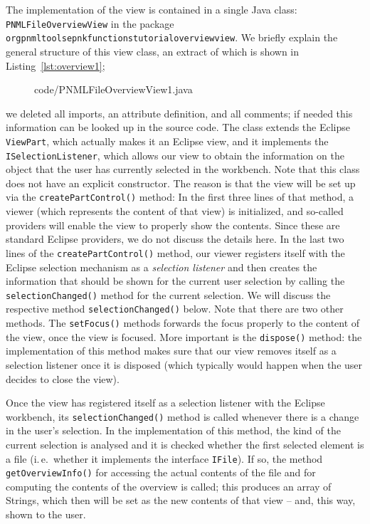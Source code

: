 The implementation of the view is contained in a single Java class: {\tt
PNMLFileOverviewView} in the package
{\tt org\qnsep{}pnml\qnsep{}tools\qnsep{}epnk\qnsep{}functions\qnsep{}tutorial\qnsep{}overviewview}.
We briefly explain the general structure of this view class, an extract
of which is shown in Listing~\ref{lst:overview1};
%
\begin{figure}[htbp!]
%
  {code/PNMLFileOverviewView1.java}
\end{figure}
%
we deleted all imports, an attribute definition, and all comments; if needed
this information can be looked up in the source code. The class extends the Eclipse
{\tt ViewPart},%
which actually makes it an Eclipse view, and it implements the {\tt
ISelectionListener},%
which allows our view to obtain the information on the object that the user
has currently selected in the workbench.
Note that this class does not have an explicit constructor. The reason is that
the view will be set up via the {\tt createPartControl()} method:
In the first three lines of that method, a viewer (which represents the content
of that view) is initialized, and so-called providers will enable the view to
properly show the contents. Since these are standard Eclipse providers, we do
not discuss the details here.
In the last two lines of the {\tt createPartControl()} method,
our viewer registers itself with the Eclipse selection mechanism
as a \emph{selection listener}%
and then creates the information that should be shown for the current user selection
by calling the {\tt selectionChanged()} method for the current selection. We will discuss
the respective method {\tt selectionChanged()} below.  Note that
there are two other methods. The {\tt setFocus()} methods forwards the
focus properly to the content of the view, once the view is focused.
More important is the {\tt dispose()} method: the implementation of
this method makes sure that our view removes itself as a selection
listener once it is disposed (which typically would happen when the
user decides to close the view).

Once the view has registered itself as a selection listener with
the Eclipse workbench, its {\tt selectionChanged()} method is
called whenever there is a change in the user's selection.
In the implementation of this method, the kind of the current
selection is analysed and it is checked whether the first
selected element is a file (i.\,e.\ whether it implements the
interface {\tt IFile}). If so, the method {\tt getOverviewInfo()}
for accessing the actual contents of the file and for computing
the contents of the overview is called; this produces an array of
Strings, which then will be set as the new contents of that view --
and, this way, shown to the user.%

